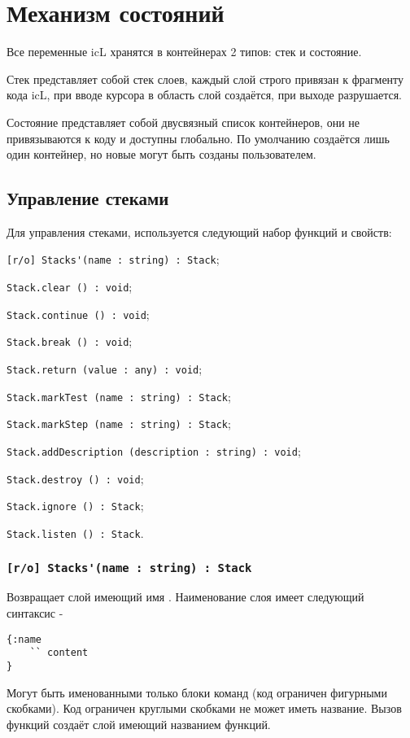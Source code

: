 \section{Механизм состояний}

Все переменные icL хранятся в контейнерах 2 типов: стек и состояние.

Стек представляет собой стек слоев, каждый слой строго привязан к фрагменту кода icL, при вводе курсора в область слой создаётся, при выходе разрушается.

Состояние представляет собой двусвязный список контейнеров, они не привязываются к коду и доступны глобально. По умолчанию создаётся лишь один контейнер, но новые могут быть созданы пользователем.

\subsection{Управление стеками}
\label{stack:control}

Для управления стеками, используется следующий набор функций и свойств:
\begin{icItems}
	\item \lstinline|[r/o] Stacks'(name : string) : Stack|;
	\item \lstinline|Stack.clear () : void|;
	\item \lstinline|Stack.continue () : void|;
	\item \lstinline|Stack.break () : void|;
	\item \lstinline|Stack.return (value : any) : void|;
	\item \lstinline|Stack.markTest (name : string) : Stack|;
	\item \lstinline|Stack.markStep (name : string) : Stack|;
	\item \lstinline|Stack.addDescription (description : string) : void|;
	\item \lstinline|Stack.destroy () : void|;
	\item \lstinline|Stack.ignore () : Stack|;
	\item \lstinline|Stack.listen () : Stack|.
\end{icItems}

\subsubsection{\lstinline|[r/o] Stacks'(name : string) : Stack|}

Возвращает слой имеющий имя . Наименование слоя имеет следующий синтаксис -
\begin{lstlisting}[numbers=none]
{:name
	`` content
}
\end{lstlisting}
Могут быть именованными только блоки команд (код ограничен фигурными скобками). Код ограничен круглыми скобками не может иметь название. Вызов функций создаёт слой имеющий названием функций.


